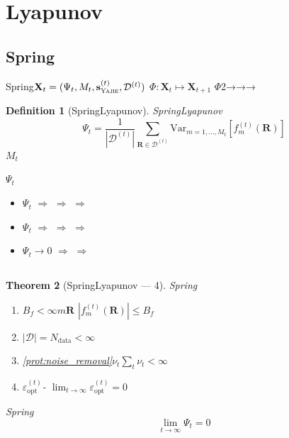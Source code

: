 \documentclass[12pt,a4paper]{article}
\newtheorem{theorem}{Theorem}[section]
\newtheorem{definition}[theorem]{Definition}
\theoremstyle{remark}
\newcommand{\Var}{\mathrm{Var}}
\newcommand{\D}{\mathcal{D}}
\newcommand{\Yajie}{\textsc{Yajie}}
\newcommand{\Lyap}{\ensuremath{\Psi}}
\begin{document}
\newpage

\section{Lyapunov}

\subsection{Spring}

Spring$\mathbf{X}_t = (\Lyap_t, M_t, \mathbf{s}_{\Yajie}^{(t)}, \D^{(t)})$
$\Phi: \mathbf{X}_t \mapsto \mathbf{X}_{t+1}$
$\Phi$2→→→

\begin{definition}[SpringLyapunov]\label{def:lyap}
SpringLyapunov
\begin{equation}\label{eq:Lyap_def}
    \boxed{\Lyap_t = \frac{1}{|\D^{(t)}|}\sum_{\mathbf{R} \in \D^{(t)}} \Var_{m=1,\ldots,M_t}\left[f_m^{(t)}(\mathbf{R})\right]}
\end{equation}
$M_t$
\end{definition}

$\Lyap_t$
\begin{itemize}[nosep]
    \item $\Lyap_t$ $\Longrightarrow$  $\Longrightarrow$  $\Longrightarrow$ 
    \item $\Lyap_t$ $\Longrightarrow$  $\Longrightarrow$  $\Longrightarrow$ 
    \item $\Lyap_t \to 0$ $\Longrightarrow$  $\Longrightarrow$ 
\end{itemize}

\subsection{}

\begin{theorem}[SpringLyapunov — 4]\label{thm:lyap_convergence}
Spring
\begin{enumerate}[label=(C\arabic*),leftmargin=*,itemsep=3pt]
    \item \textbf{} $B_f < \infty$$m$$\mathbf{R}$
    $|f_m^{(t)}(\mathbf{R})| \leq B_f$
    \item \textbf{} $|\D| = N_{\text{data}} < \infty$
    \item \textbf{} \ref{prot:noise_removal}$\nu_t$$\sum_t \nu_t < \infty$
    \item \textbf{} $\varepsilon_{\text{opt}}^{(t)}$-
    $\lim_{t\to\infty} \varepsilon_{\text{opt}}^{(t)} = 0$
\end{enumerate}
Spring
\begin{equation}\label{eq:lyap_convergence}
    \boxed{\lim_{t \to \infty} \Lyap_t = 0}
\end{equation}

\end{theorem}
\end{document}
